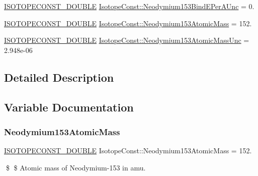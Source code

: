 \begin{DoxyCompactItemize}
\mbox{\hyperlink{group___isotope_const-_macros_ga8f45a7272ce02c0b4c65c44636ed719a}{I\+S\+O\+T\+O\+P\+E\+C\+O\+N\+S\+T\+\_\+\+D\+O\+U\+B\+LE}} \mbox{\hyperlink{group___isotope_const-_neodymium-_nd153_gae420a9f3ede32e5767e913d9827c72f8}{Isotope\+Const\+::\+Neodymium153\+Bind\+E\+Per\+A\+Unc}} = 0.
\item 
\mbox{\hyperlink{group___isotope_const-_macros_ga8f45a7272ce02c0b4c65c44636ed719a}{I\+S\+O\+T\+O\+P\+E\+C\+O\+N\+S\+T\+\_\+\+D\+O\+U\+B\+LE}} \mbox{\hyperlink{group___isotope_const-_neodymium-_nd153_ga2ba30c18e8b8cef5796f39c2f6291123}{Isotope\+Const\+::\+Neodymium153\+Atomic\+Mass}} = 152.
\item 
\mbox{\hyperlink{group___isotope_const-_macros_ga8f45a7272ce02c0b4c65c44636ed719a}{I\+S\+O\+T\+O\+P\+E\+C\+O\+N\+S\+T\+\_\+\+D\+O\+U\+B\+LE}} \mbox{\hyperlink{group___isotope_const-_neodymium-_nd153_ga4a50978607ff3f400e151f11468bdf9a}{Isotope\+Const\+::\+Neodymium153\+Atomic\+Mass\+Unc}} = 2.\+948e-\/06
\end{DoxyCompactItemize}


\subsection{Detailed Description}


\subsection{Variable Documentation}
\mbox{\label{group___isotope_const-_neodymium-_nd153_ga2ba30c18e8b8cef5796f39c2f6291123}} 
\subsubsection{\texorpdfstring{Neodymium153\+Atomic\+Mass}{Neodymium153AtomicMass}}
{\footnotesize\ttfamily \mbox{\hyperlink{group___isotope_const-_macros_ga8f45a7272ce02c0b4c65c44636ed719a}{I\+S\+O\+T\+O\+P\+E\+C\+O\+N\+S\+T\+\_\+\+D\+O\+U\+B\+LE}} Isotope\+Const\+::\+Neodymium153\+Atomic\+Mass = 152.}

\$ \$ Atomic mass of Neodymium-\/153 in amu. \mbox{\label{group___isotope_const-_neodymium-_nd153_ga4a50978607ff3f400e151f11468bdf9a}} 
